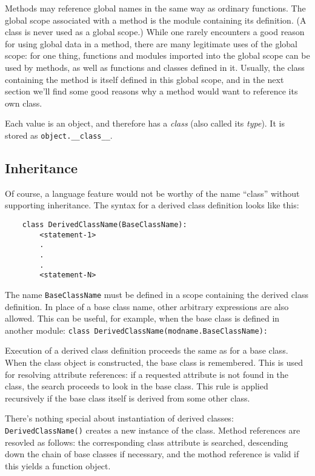 \documentclass[UTF8]{article}
\begin{document}
Methods may reference global names in the same way as ordinary functions. The global scope
associated with a method is the module containing its definition. (A class is never used as a
global scope.) While one rarely encounters a good reason for using global data in a method, there
are many legitimate uses of the global scope: for one thing, functions and modules imported into
the global scope can be used by methods, as well as functions and classes defined in it. Usually,
the class containing the method is itself defined in this global scope, and in the next section
we'll find some good reasons why a method would want to reference its own class.

Each value is an object, and therefore has a \emph{class} (also called its \emph{type}). It is
stored as \texttt{object.\_\_class\_\_}.

\subsection{Inheritance}
Of course, a language feature would not be worthy of the name ``class'' without supporting
inheritance. The syntax for a derived class definition looks like this:
\begin{verbatim}
    class DerivedClassName(BaseClassName):
        <statement-1>
        .
        .
        .
        <statement-N>
\end{verbatim}

The name \texttt{BaseClassName} must be defined in a scope containing the derived class definition.
In place of a base class name, other arbitrary expressions are also allowed. This can be useful,
for example, when the base class is defined in another module:
\texttt{class DerivedClassName(modname.BaseClassName):}

Execution of a derived class definition proceeds the same as for a base class. When the class
object is constructed, the base class is remembered. This is used for resolving attribute
references: if a requested attribute is not found in the class, the search proceeds to look in the
base class. This rule is applied recursively if the base class itself is derived from some other
class.

There's nothing special about instantiation of derived classes: \texttt{DerivedClassName()} creates
a new instance of the class. Method references are resovled as follows: the corresponding class
attribute is searched, descending down the chain of base classes if necessary, and the mothod
reference is valid if this yields a function object.
\end{document}
